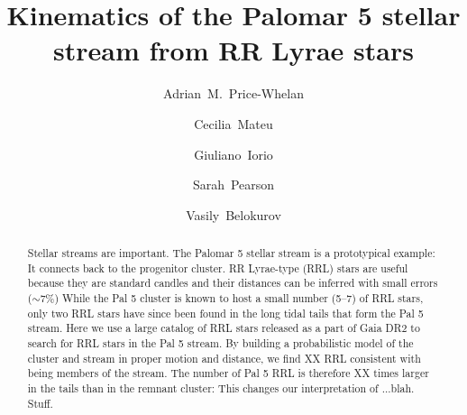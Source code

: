 \documentclass[twocolumn]{aastex63}
\begin{document}
\title{Kinematics of the Palomar 5 stellar stream from RR Lyrae stars}

\author[0000-0003-0872-7098]{Adrian~M.~Price-Whelan}

\author[0000-0002-6330-2394]{Cecilia~Mateu}
    

\author{Giuliano~Iorio}

\author{Sarah~Pearson}

\author{Vasily~Belokurov}



\begin{abstract}
Stellar streams are important.
The Palomar 5 stellar stream is a prototypical example: It connects back to the progenitor cluster.
RR Lyrae-type (RRL) stars are useful because they are standard candles and their distances can be inferred with small errors ($\sim7\%$)
While the Pal 5 cluster is known to host a small number (5--7) of RRL stars, only two RRL stars have since been found in the long tidal tails that form the Pal 5 stream.
Here we use a large catalog of RRL stars released as a part of Gaia DR2 to search for RRL stars in the Pal 5 stream.
By building a probabilistic model of the cluster and stream in proper motion and distance, we find XX RRL consistent with being members of the stream.
The number of Pal 5 RRL is therefore XX times larger in the tails than in the remnant cluster: This changes our interpretation of ...blah.
Stuff.
\end{abstract}

\end{document}
